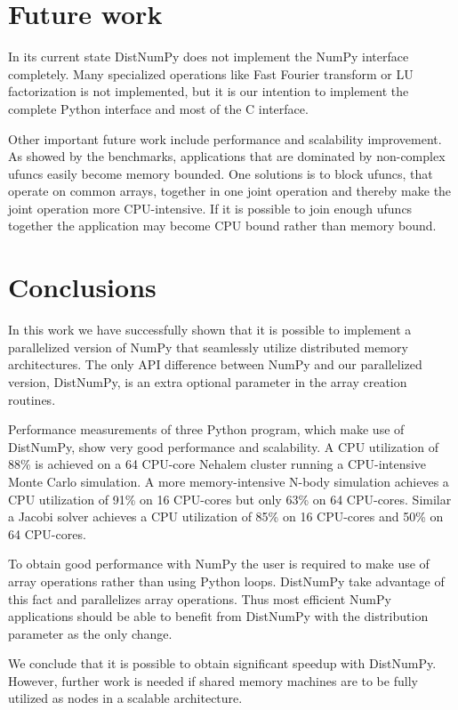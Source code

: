 \documentclass[10pt]{article}
\begin{document}
\section{Future work}
In its current state DistNumPy does not implement the NumPy interface completely. Many specialized operations like Fast Fourier transform or LU factorization is not implemented, but it is our intention to implement the complete Python interface and most of the C interface.

Other important future work include performance and scalability improvement. As showed by the benchmarks, applications that are dominated by non-complex ufuncs easily become memory bounded. One solutions is to block ufuncs, that operate on common arrays, together in one joint operation and thereby make the joint operation more CPU-intensive. If it is possible to join enough ufuncs together the application may become CPU bound rather than memory bound.

\section{Conclusions}
In this work we have successfully shown that it is possible to implement a parallelized version of NumPy\cite{numpy} that seamlessly utilize distributed memory architectures. The only API difference between NumPy and our parallelized version, DistNumPy, is an extra optional parameter in the array creation routines.

Performance measurements of three Python program, which make use of DistNumPy, show very good performance and scalability. A CPU utilization of 88\% is achieved on a 64 CPU-core Nehalem cluster running a CPU-intensive Monte Carlo simulation. A more memory-intensive N-body simulation achieves a CPU utilization of 91\% on 16 CPU-cores but only 63\% on 64 CPU-cores. Similar a Jacobi solver achieves a CPU utilization of 85\% on 16 CPU-cores and 50\% on 64 CPU-cores.

To obtain good performance with NumPy the user is required to make use of array operations rather than using Python loops. DistNumPy take advantage of this fact and parallelizes array operations. Thus most efficient NumPy applications should be able to benefit from DistNumPy with the distribution parameter as the only change.

We conclude that it is possible to obtain significant speedup with DistNumPy. However, further work is needed if shared memory machines are to be fully utilized as nodes in a scalable architecture.






%

\end{document}
